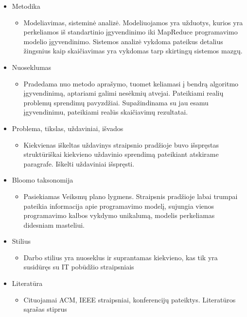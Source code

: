 \documentclass[10pt, onecolumn]{IEEEtran}
\begin{document}
\begin{itemize}
	      \item Metodika
	        \begin{itemize}
	          \item Modeliavimas, sisteminė analizė. Modeliuojamos yra užduotys, kurios yra perkeliamos iš standartinio įgyvendinimo iki MapReduce programavimo modelio įgyvendinimo. Sistemos analizė vykdoma pateikus detalius žingsnius kaip skaičiavimas yra vykdomas tarp skirtingų sistemos mazgų.
	        \end{itemize}
	      \item Nuoseklumas
	        \begin{itemize}
	          \item Pradedama nuo metodo aprašymo, tuomet keliamasi į bendrą algoritmo įgyvendinimą, aptariami galimi nesėkmių atvejai. Pateikiami realių problemų sprendimų pavyzdžiai. Supažindinama su jau esamu įgyvendinimu, pateikiami realūs skaičiavimų rezultatai.
	        \end{itemize}
	      \item Problema, tikslas, uždaviniai, išvados
	        \begin{itemize}
	          \item Kiekvienas iškeltas uždavinys straipsnio pradžioje buvo išspręstas struktūriškai kiekvieno uždavinio sprendimą pateikiant atskirame paragrafe. Iškelti uždaviniai išspręsti.
	        \end{itemize}
	      \item Bloomo taksonomija
	        \begin{itemize}
	          \item Pasiekiamas Veiksmų plano lygmens. Straipsnis pradžioje labai trumpai pateikia informacija apie programavimo modelį, sujungia vienos programavimo kalbos vykdymo unikalumą, modelis perkeliamas didesniam masteliui.
	        \end{itemize}
	      \item Stilius
	        \begin{itemize}
	          \item Darbo stilius yra nuoseklus ir suprantamas kiekvieno, kas tik yra susidūręs su IT pobūdžio straipsniais
	        \end{itemize}
	      \item Literatūra
	        \begin{itemize}
	          \item Cituojamai ACM, IEEE straipsniai, konferencijų pateiktys. Literatūros sąrašas stiprus
	        \end{itemize}
	    \end{itemize}
\end{document}
